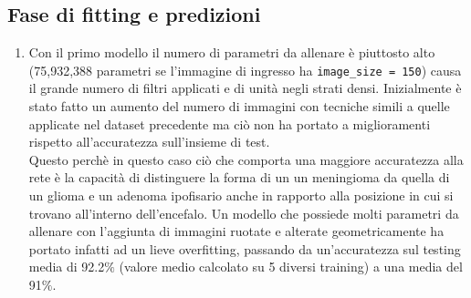 \subsection{Fase di fitting e predizioni}
  \begin{enumerate}
    \item Con il primo modello il numero di parametri da allenare è piuttosto alto (75,932,388 parametri se l'immagine di ingresso ha 
    \lstinline{image_size = 150})
    causa il grande numero di filtri applicati e di unità negli strati densi. 
    Inizialmente è stato fatto un aumento del numero di immagini con tecniche simili a quelle applicate
     nel dataset precedente
    ma ciò non ha portato a
     miglioramenti rispetto all'accuratezza sull'insieme di test.\\
     Questo perchè in questo caso ciò che comporta una maggiore accuratezza alla rete 
     è la capacità di distinguere la forma di un un meningioma da quella di un glioma e un adenoma
      ipofisario anche in rapporto alla posizione in cui si trovano all'interno dell'encefalo. 
      Un modello che possiede molti parametri da allenare  con l'aggiunta di immagini
      ruotate e alterate geometricamente ha portato infatti ad un lieve overfitting, 
       passando da un'accuratezza sul testing media di 92.2$\%$ (valore medio calcolato su 5 diversi training)
        a una media del 91$\%$. 
       

\end{enumerate}
